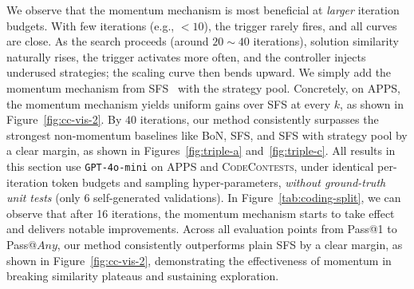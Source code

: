 \documentclass[11pt]{article}
\theoremstyle{definition}
\theoremstyle{remark}
\begin{document}
We observe that the momentum mechanism is most beneficial at \emph{larger} iteration budgets. With few iterations (e.g., $<\!10$), the trigger rarely fires, and all curves are close. 
As the search proceeds (around $20{\sim}40$ iterations), solution similarity naturally rises, the trigger activates more often, and the controller injects underused strategies; the scaling curve then bends upward. We simply add the momentum mechanism from SFS~\citep{light2025sfs} with the strategy pool. Concretely, on APPS, the momentum mechanism yields uniform gains over SFS at every $k$, as shown in Figure~\ref{fig:cc-vis-2}. By $40$ iterations, our method consistently surpasses the strongest non-momentum baselines like BoN, SFS, and SFS with strategy pool by a clear margin, as shown in Figures~\ref{fig:triple-a} and~\ref{fig:triple-c}.  All results in this section use \texttt{GPT-4o-mini} on \textsc{APPS} and \textsc{CodeContests}, under identical per-iteration token budgets and sampling hyper-parameters, \emph{without ground-truth unit tests} (only 6 self-generated validations). In Figure~\ref{tab:coding-split},  we can observe that after 16 iterations, the momentum mechanism starts to take effect and delivers notable improvements. Across all evaluation points from Pass@1 to Pass@\!$Any$, our method consistently 
outperforms plain SFS by a clear margin, as shown in Figure~\ref{fig:cc-vis-2}, demonstrating the effectiveness of
momentum in breaking similarity plateaus and sustaining exploration.
\end{document}
